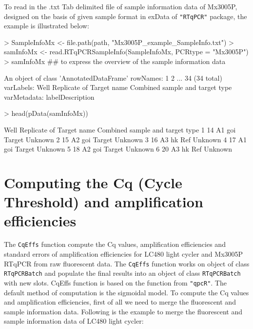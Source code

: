 \documentclass[11pt]{article}
\newcommand{\code}[1]{{\tt #1}}
\newcommand{\pkg}[1]{{\tt "#1"}}
\begin{document}
To read in the .txt Tab delimited file of sample information data of Mx3005P, designed on the basis of given 
sample format in exData of \pkg{RTqPCR} package, the example is illustrated below:
\begin{Schunk}
\begin{Sinput}
> SampleInfoMx <- file.path(path, "Mx3005P_example_SampleInfo.txt")
> samInfoMx <- read.RTqPCRSampleInfo(SampleInfoMx, PCRtype = "Mx3005P")
> samInfoMx ## to express the overview of the sample information data
\end{Sinput}
\begin{Soutput}
An object of class 'AnnotatedDataFrame'
  rowNames: 1 2 ... 34 (34 total)
  varLabels: Well Replicate of Target name Combined sample and target
    type
  varMetadata: labelDescription
\end{Soutput}
\begin{Sinput}
> head(pData(samInfoMx))
\end{Sinput}
\begin{Soutput}
  Well Replicate of Target name Combined sample and target type
1   14           A1         goi                  Target Unknown
2   15           A2         goi                  Target Unknown
3   16           A3          hk                     Ref Unknown
4   17           A1         goi                  Target Unknown
5   18           A2         goi                  Target Unknown
6   20           A3          hk                     Ref Unknown
\end{Soutput}
\end{Schunk}
\section{Computing the Cq (Cycle Threshold) and amplification efficiencies} 
The \code{CqEffs} function compute the Cq values, amplification efficiencies and standard errors of 
amplification efficiencies for LC480 light cycler and  Mx3005P RTqPCR from raw fluorescent data. The \code{CqEffs} function works on object of class \code{RTqPCRBatch} and populate the final results into an object of 
class \code{RTqPCRBatch} with new slots. CqEffs function is based on the function \code{}
from \pkg{qpcR}. The default method of computation is the sigmoidal model. To compute the Cq values and amplification efficiencies, first of all we need to merge the fluorescent and sample information data. Following is the example to merge the fluorescent and sample information data of LC480 light cycler:
\end{document}
